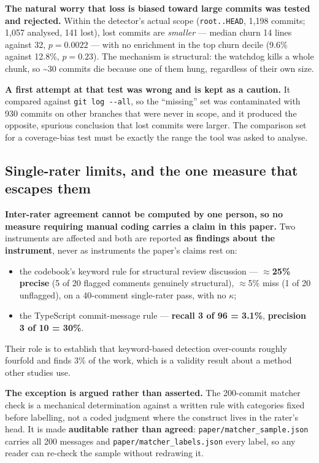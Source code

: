 \documentclass[11pt,a4paper]{article}
\begin{document}
\textbf{The natural worry that loss is biased toward large commits was tested and rejected.} Within the detector's actual scope (\texttt{root.\allowbreak{}.\allowbreak{}HEAD}, 1,198 commits; 1,057 analysed, 141 lost), lost commits are \emph{smaller} --- median churn 14 lines against 32, $p=0.0022$ --- with no enrichment in the top churn decile (9.6\% against 12.8\%, $p=0.23$). The mechanism is structural: the watchdog kills a whole chunk, so \textasciitilde{}30 commits die because one of them hung, regardless of their own size.

\textbf{A first attempt at that test was wrong and is kept as a caution.} It compared against \texttt{git log -\allowbreak{}-\allowbreak{}all}, so the ``missing'' set was contaminated with 930 commits on other branches that were never in scope, and it produced the opposite, spurious conclusion that lost commits were larger. The comparison set for a coverage-bias test must be exactly the range the tool was asked to analyse.

\subsection{Single-rater limits, and the one measure that escapes them}
\label{sec:6.5}

\textbf{Inter-rater agreement cannot be computed by one person, so no measure requiring manual coding carries a claim in this paper.} Two instruments are affected and both are reported \textbf{as findings about the instrument}, never as instruments the paper's claims rest on:

\begin{itemize}
\item the codebook's keyword rule for structural review discussion --- \textbf{$\approx$25\% precise} (5 of 20 flagged comments genuinely structural), $\approx$5\% miss (1 of 20 unflagged), on a 40-comment single-rater pass, with no $\kappa$;
\item the TypeScript commit-message rule --- \textbf{recall 3 of 96 = 3.1\%}, \textbf{precision 3 of 10 = 30\%}.
\end{itemize}

Their role is to establish that keyword-based detection over-counts roughly fourfold and finds 3\% of the work, which is a validity result about a method other studies use.

\textbf{The exception is argued rather than asserted.} The 200-commit matcher check is a mechanical determination against a written rule with categories fixed before labelling, not a coded judgment where the construct lives in the rater's head. It is made \textbf{auditable rather than agreed}: \texttt{paper/\allowbreak{}matcher\_\allowbreak{}sample.\allowbreak{}json} carries all 200 messages and \texttt{paper/\allowbreak{}matcher\_\allowbreak{}labels.\allowbreak{}json} every label, so any reader can re-check the sample without redrawing it.
\end{document}
